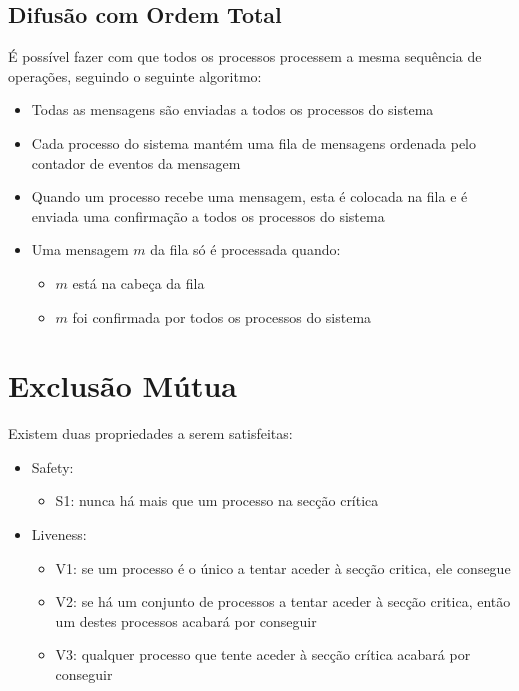 \documentclass[10pt,a4paper]{report}
\begin{document}
\subsection{Difusão com Ordem Total}
É possível fazer com que todos os processos processem a mesma sequência de operações, seguindo o seguinte algoritmo:
\begin{itemize}
\item Todas as mensagens são enviadas a todos os processos do sistema
\item Cada processo do sistema mantém uma fila de mensagens ordenada pelo contador de eventos da mensagem
\item Quando um processo recebe uma mensagem, esta é colocada na fila e é enviada uma confirmação a todos os processos do sistema
\item Uma mensagem $m$ da fila só é processada quando:
\begin{itemize}
\item $m$ está na cabeça da fila
\item $m$ foi confirmada por todos os processos do sistema
\end{itemize}
\end{itemize}
\section{Exclusão Mútua}
Existem duas propriedades a serem satisfeitas: 
\begin{itemize}
\item Safety:
\begin{itemize}
\item S1: nunca há mais que um processo na secção crítica
\end{itemize}
\item Liveness:
\begin{itemize}
\item V1: se um processo é o único a tentar aceder à secção critica, ele consegue
\item V2: se há um conjunto de processos a tentar aceder à secção critica, então um destes processos acabará por conseguir
\item V3: qualquer processo que tente aceder à secção crítica acabará por conseguir
\end{itemize}
\end{itemize}
\end{document}
